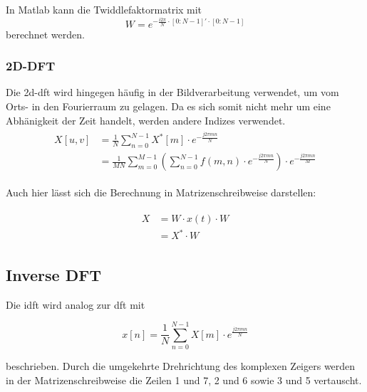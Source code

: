 In Matlab kann die Twiddlefaktormatrix mit
\begin{equation}\label{eq:matlab_dft_faktoren}
 W = e^{-\frac{i 2 \pi}{N}\cdot[0:N-1]'\cdot[0:N-1]}
\end{equation}
berechnet werden.


\subsubsection{2D-DFT}
Die \gls{2d-dft} wird hingegen häufig in der Bildverarbeitung verwendet, um vom Orts- in den Fourierraum zu gelagen. Da es sich somit nicht mehr um eine Abhänigkeit 
der Zeit handelt, werden andere Indizes verwendet.
\begin{align}
\begin{split}
X[u,v] 	&= \frac{1}{N} \sum^{N-1}_{n=0} X^* \left[ m \right] \cdot e^{-\frac{j 2 \pi m n}{N}}\\
	&= \frac{1}{MN} \sum^{M-1}_{m=0} \left( \sum^{N-1}_{n=0} f(m,n) \cdot e^{-\frac{j 2 \pi m n}{N}} \right) \cdot e^{-\frac{j 2 \pi m n}{M}}
\end{split}
\end{align}

Auch hier lässt sich die Berechnung in Matrizenschreibweise darstellen:

\begin{align}
\begin{split}
 X &= W \cdot x\left(t\right) \cdot W \\
                    &= X^* \cdot W
\end{split}
\end{align}



\subsection{Inverse DFT}

Die \gls{idft} wird analog zur \gls{dft} mit 

\begin{equation}\label{eq:idft}
 x \left[ n \right] = \frac{1}{N} \sum^{N-1}_{n=0} X[m] \cdot e^{\frac{j 2 \pi m n}{N}}
\end{equation}

beschrieben. Durch die umgekehrte Drehrichtung des komplexen Zeigers werden in der Matrizenschreibweise die Zeilen 1 und 7, 2 und 6 sowie 3 und 5 vertauscht.



